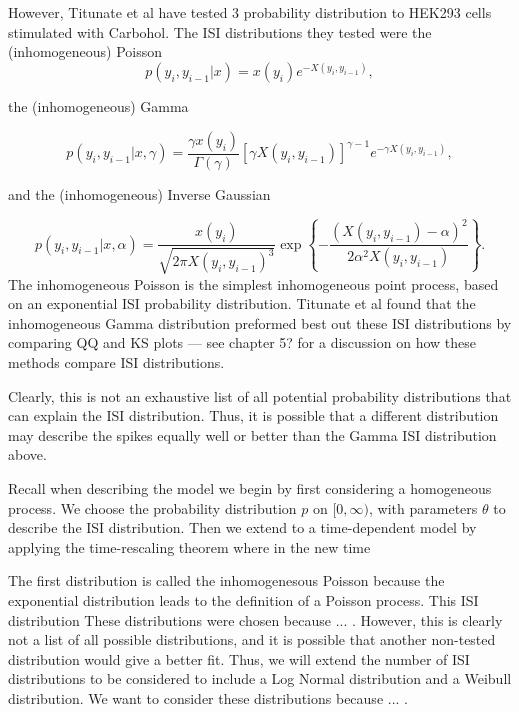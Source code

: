 \documentclass[../main.tex]{subfiles}
\begin{document}
However, Titunate et al \cite{} have tested 3 probability distribution to HEK293 cells stimulated with Carbohol. The ISI distributions they tested were the 
 (inhomogeneous) Poisson 
$$
p(y_i,y_{i-1} | x) = x(y_i) e^{-X(y_i,y_{i-1})} ,
$$

the (inhomogeneous) Gamma

$$
p(y_i,y_{i-1} | x,\gamma) = \frac{\gamma x(y_i)}{\Gamma(\gamma)}\left[\gamma X(y_i,y_{i-1}) \right]^{\gamma -1} e^{-\gamma X(y_i,y_{i-1})},
$$

and the (inhomogeneous) Inverse Gaussian

$$
p(y_i,y_{i-1} | x,\alpha) = \frac{x(y_i)}{\sqrt{2 \pi X(y_i,y_{i-1})^3}} \exp \left\{ -\frac{\left( X(y_i,y_{i-1}) - \alpha \right)^2}{2 \alpha^2 X(y_i,y_{i-1}) } \right\}.
$$
The inhomogeneous Poisson is the simplest inhomogeneous point process, based on an exponential ISI probability distribution. Titunate et al found that the inhomogeneous Gamma distribution preformed best out these ISI distributions by comparing QQ and KS plots --- see chapter 5? for a discussion on how these methods compare ISI distributions. 

Clearly, this is not an exhaustive list of all potential probability distributions that can explain the ISI distribution. Thus, it is possible that a different distribution may describe the  spikes equally well or better than the Gamma ISI distribution above. 

Recall when describing the model we begin by first considering a homogeneous process. We choose the probability distribution $p$ on $[0,\infty)$, with parameters $\theta$ to describe the ISI distribution. Then we extend to a time-dependent model by applying the time-rescaling theorem where in the new time  
 
The first distribution is called the inhomogenesous Poisson because the exponential distribution leads to the definition of a Poisson process. This ISI distribution    These distributions were chosen because ... . However, this is clearly not a list of all possible distributions, and it is possible that another non-tested distribution would give a better fit. Thus, we will extend the number of ISI distributions to be considered to include a Log Normal distribution and a Weibull distribution. We want to consider these distributions because ... . 
\end{document}
